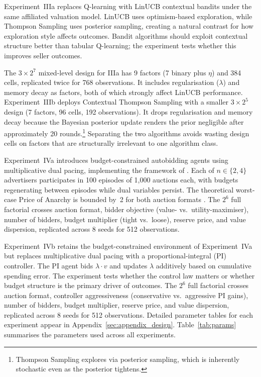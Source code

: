 Experiment~IIIa replaces Q-learning with LinUCB contextual bandits under the same affiliated valuation model. LinUCB uses optimism-based exploration, while Thompson Sampling uses posterior sampling, creating a natural contrast for how exploration style affects outcomes. Bandit algorithms should exploit contextual structure better than tabular Q-learning; the experiment tests whether this improves seller outcomes.

The $3 \times 2^7$ mixed-level design for IIIa has 9 factors (7 binary plus $\eta$) and 384 cells, replicated twice for 768 observations. It includes regularisation ($\lambda$) and memory decay as factors, both of which strongly affect LinUCB performance. Experiment~IIIb deploys Contextual Thompson Sampling with a smaller $3 \times 2^5$ design (7 factors, 96 cells, 192 observations). It drops regularisation and memory decay because the Bayesian posterior update renders the prior negligible after approximately 20 rounds.\footnote{Thompson Sampling explores via posterior sampling, which is inherently stochastic even as the posterior tightens.} Separating the two algorithms avoids wasting design cells on factors that are structurally irrelevant to one algorithm class.

Experiment~IVa introduces budget-constrained autobidding agents using multiplicative dual pacing, implementing the framework of \citet{Balseiro2019Learning}. Each of $n \in \{2, 4\}$ advertisers participates in 100 episodes of 1{,}000 auctions each, with budgets regenerating between episodes while dual variables persist. The theoretical worst-case Price of Anarchy is bounded by~2 for both auction formats \citep{Aggarwal2019, Gaitonde2023}. The $2^6$ full factorial crosses auction format, bidder objective (value- vs.\ utility-maximiser), number of bidders, budget multiplier (tight vs.\ loose), reserve price, and value dispersion, replicated across 8 seeds for 512 observations.

Experiment~IVb retains the budget-constrained environment of Experiment~IVa but replaces multiplicative dual pacing with a proportional-integral (PI) controller. The PI agent bids $\lambda \cdot v$ and updates $\lambda$ additively based on cumulative spending error. The experiment tests whether the control law matters or whether budget structure is the primary driver of outcomes. The $2^6$ full factorial crosses auction format, controller aggressiveness (conservative vs.\ aggressive PI gains), number of bidders, budget multiplier, reserve price, and value dispersion, replicated across 8 seeds for 512 observations. Detailed parameter tables for each experiment appear in Appendix~\ref{sec:appendix_design}. Table~\ref{tab:params} summarises the parameters used across all experiments.

